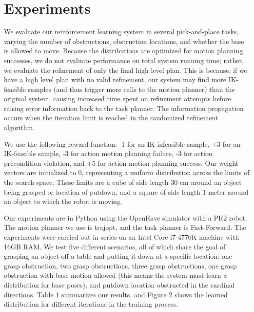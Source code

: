 \section{Experiments}
We evaluate our reinforcement learning system in several pick-and-place
tasks, varying the number of obstructions, obstruction locations, and whether
the base is allowed to move. Because the distributions are optimized for
motion planning successes, we do not evaluate performance on total system
running time; rather, we evaluate the refinement of only the final high level
plan. This is because, if we have a high level plan with no valid refinement,
our system may find more IK-feasible samples (and thus trigger more calls to
the motion planner) than the original system, causing increased time spent
on refinement attempts before raising error information back to the task planner.
The information propagation occurs when the iteration limit is reached in
the randomized refinement algorithm.

We use the following reward function: -1 for an IK-infeasible sample, +3 for
an IK-feasible sample, -3 for action motion planning failure, -3 for action
precondition violation, and +5 for action motion planning success. Our weight
vectors are initialized to 0, representing a uniform distribution across
the limits of the search space. These limits are a cube of side length 30 cm
around an object being grasped or location of putdown, and a square of side
length 1 meter around an object to which the robot is moving.

Our experiments are in Python using the OpenRave simulator with a PR2 robot.
The motion planner we use is trajopt, and the task planner is Fast-Forward.
The experiments were carried out in series on an Intel Core i7-4770K machine
with 16GB RAM. We test five different scenarios, all of which share the goal
of grasping an object off a table and putting it down at a specific location:
one grasp obstruction, two grasp obstructions, three grasp obstructions,
one grasp obstruction with base motion allowed (this means the system must learn
a distribution for base poses), and putdown location obstructed in the cardinal
directions. Table 1 summarizes our results, and Figure 2 shows the learned distribution
for different iterations in the training process.